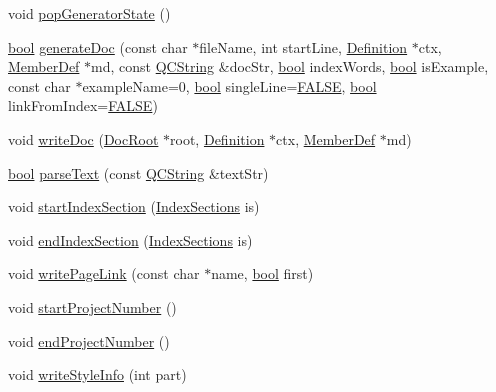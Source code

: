 \begin{DoxyCompactItemize}
\item 
void \hyperlink{class_output_list_a94eb1af2ea07425ef1faa539d24adcf8}{pop\+Generator\+State} ()
\item 
\hyperlink{qglobal_8h_a1062901a7428fdd9c7f180f5e01ea056}{bool} \hyperlink{class_output_list_a344adfca4d8515fcef66a4d96e1454f3}{generate\+Doc} (const char $\ast$file\+Name, int start\+Line, \hyperlink{class_definition}{Definition} $\ast$ctx, \hyperlink{class_member_def}{Member\+Def} $\ast$md, const \hyperlink{class_q_c_string}{Q\+C\+String} \&doc\+Str, \hyperlink{qglobal_8h_a1062901a7428fdd9c7f180f5e01ea056}{bool} index\+Words, \hyperlink{qglobal_8h_a1062901a7428fdd9c7f180f5e01ea056}{bool} is\+Example, const char $\ast$example\+Name=0, \hyperlink{qglobal_8h_a1062901a7428fdd9c7f180f5e01ea056}{bool} single\+Line=\hyperlink{qglobal_8h_a10e004b6916e78ff4ea8379be80b80cc}{F\+A\+L\+S\+E}, \hyperlink{qglobal_8h_a1062901a7428fdd9c7f180f5e01ea056}{bool} link\+From\+Index=\hyperlink{qglobal_8h_a10e004b6916e78ff4ea8379be80b80cc}{F\+A\+L\+S\+E})
\item 
void \hyperlink{class_output_list_ab7f31928be80a659ed3e394e61ab0323}{write\+Doc} (\hyperlink{class_doc_root}{Doc\+Root} $\ast$root, \hyperlink{class_definition}{Definition} $\ast$ctx, \hyperlink{class_member_def}{Member\+Def} $\ast$md)
\item 
\hyperlink{qglobal_8h_a1062901a7428fdd9c7f180f5e01ea056}{bool} \hyperlink{class_output_list_ad094ea058825f0c0a7afb579af1bfc4a}{parse\+Text} (const \hyperlink{class_q_c_string}{Q\+C\+String} \&text\+Str)
\item 
void \hyperlink{class_output_list_a678ace51eccae14090a4edd88a255bc3}{start\+Index\+Section} (\hyperlink{index_8h_aec03800047ada46460eb75113cfee322}{Index\+Sections} is)
\item 
void \hyperlink{class_output_list_a6468fd401e46c0b28ffb2f3189d3078a}{end\+Index\+Section} (\hyperlink{index_8h_aec03800047ada46460eb75113cfee322}{Index\+Sections} is)
\item 
void \hyperlink{class_output_list_ad8981d3a92e71f581980476e284c5258}{write\+Page\+Link} (const char $\ast$name, \hyperlink{qglobal_8h_a1062901a7428fdd9c7f180f5e01ea056}{bool} first)
\item 
void \hyperlink{class_output_list_a5e35c28c310e74b57645aff8119c1546}{start\+Project\+Number} ()
\item 
void \hyperlink{class_output_list_ad6faf5debd750bf3fb143ffc571a0d22}{end\+Project\+Number} ()
\item 
void \hyperlink{class_output_list_a85fc0afe789c21758373df15bcb81cc9}{write\+Style\+Info} (int part)

\end{DoxyCompactItemize}
